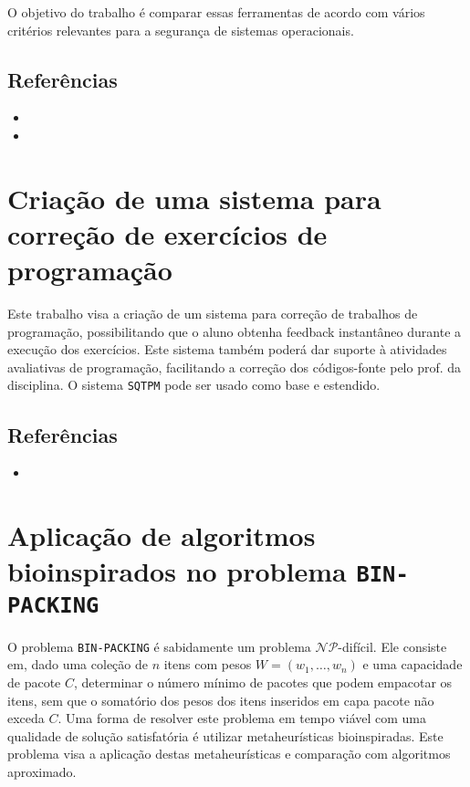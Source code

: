 \documentclass{article}
\begin{document}
O objetivo do trabalho é comparar essas ferramentas de acordo com vários critérios relevantes para a segurança de sistemas operacionais.

\subsection*{Referências}

\begin{itemize}
	\item {}
	\item {}
\end{itemize}

\section*{Criação de uma sistema para correção de exercícios de programação}

Este trabalho visa a criação de um sistema para correção de trabalhos de programação, possibilitando que o aluno obtenha feedback instantâneo durante a execução dos exercícios. Este sistema também poderá dar suporte à atividades avaliativas de programação, facilitando a correção dos códigos-fonte pelo prof. da disciplina. O sistema {\tt SQTPM} pode ser usado como base e estendido.

\subsection*{Referências}


\begin{itemize}
	\item {}
\end{itemize}

\section*{Aplicação de algoritmos bioinspirados no problema {\tt BIN-PACKING}}

O problema {\tt BIN-PACKING} é sabidamente um problema $\mathcal{N\!P}$-difícil. Ele consiste em, dado uma coleção de $n$ itens com pesos $W=(w_1,\ldots,w_n)$ e uma capacidade de pacote $C$, determinar o número mínimo de pacotes que podem empacotar os itens, sem que o somatório dos pesos dos itens inseridos em capa pacote não exceda $C$. Uma forma de resolver este problema em tempo viável com uma qualidade de solução satisfatória é utilizar metaheurísticas bioinspiradas. Este problema visa a aplicação destas metaheurísticas e comparação com algoritmos aproximado.
\end{document}
